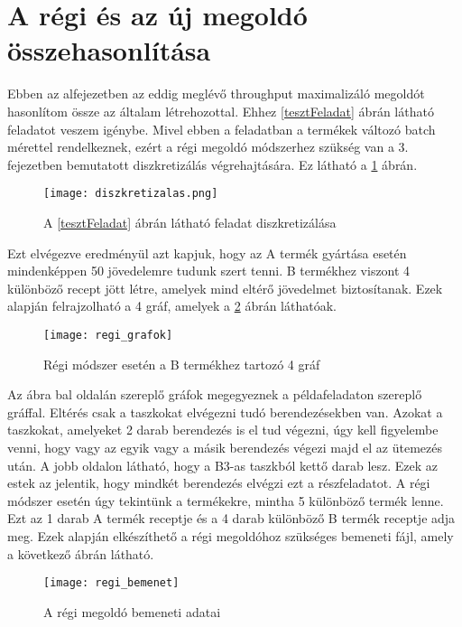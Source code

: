 \section{A régi és az új megoldó összehasonlítása}
Ebben az alfejezetben az eddig meglévő throughput maximalizáló megoldót hasonlítom össze az általam létrehozottal. Ehhez \ref{tesztFeladat} ábrán látható feladatot veszem igénybe. Mivel ebben a feladatban a termékek változó batch mérettel rendelkeznek, ezért a régi megoldó módszerhez szükség van a 3. fejezetben bemutatott diszkretizálás végrehajtására. Ez látható a \ref{diszkretizalas} ábrán.

\begin{figure}[H]
\begin{center}
\texttt{[image: diszkretizalas.png]}
\caption{A \ref{tesztFeladat} ábrán látható feladat diszkretizálása}
\label{diszkretizalas}
\end{center}
\end{figure}

Ezt elvégezve eredményül azt kapjuk, hogy az A termék gyártása esetén mindenképpen 50 jövedelemre tudunk szert tenni. B termékhez viszont 4 különböző recept jött létre, amelyek mind eltérő jövedelmet biztosítanak. Ezek alapján felrajzolható a 4 gráf, amelyek a \ref{regi_grafok} ábrán láthatóak.
\begin{figure}[H]
\begin{center}
\texttt{[image: regi\_grafok]}
\caption{Régi módszer esetén a B termékhez tartozó 4 gráf}
\label{regi_grafok}
\end{center}
\end{figure}
Az ábra bal oldalán szereplő gráfok megegyeznek a példafeladaton szereplő gráffal. Eltérés csak a taszkokat elvégezni tudó berendezésekben van. Azokat a  taszkokat, amelyeket 2 darab berendezés is el tud végezni, úgy kell figyelembe venni, hogy vagy az egyik vagy a másik berendezés végezi majd el az ütemezés után. A jobb oldalon látható, hogy a B3-as taszkból kettő darab lesz. Ezek az estek az jelentik, hogy mindkét berendezés elvégzi ezt a részfeladatot. A régi módszer esetén úgy tekintünk a termékekre, mintha 5 különböző termék lenne. Ezt az 1 darab A termék receptje és a 4 darab különböző B termék receptje adja meg. Ezek alapján elkészíthető a régi megoldóhoz szükséges bemeneti fájl, amely a következő ábrán látható. 

\begin{figure}[H]
\begin{center}
\texttt{[image: regi\_bemenet]}
\caption{A régi megoldó bemeneti adatai}
\label{regi_bemenet}
\end{center}
\end{figure}

